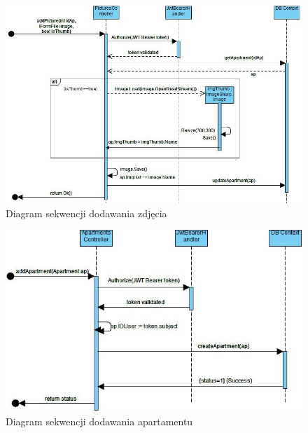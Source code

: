 \documentclass[polish, 11pt]{article}
\begin{document}
        \begin{figure}[H]
            \centering
            \includegraphics[width=\textwidth]{figures/addPictureSeq.jpg}
            \caption{Diagram sekwencji dodawania zdjęcia}
        \end{figure}
        
        \begin{figure}[H]
            \centering
            \includegraphics[width=\textwidth]{figures/addApartmentSeq.jpg}
            \caption{Diagram sekwencji dodawania apartamentu}
        \end{figure}
        
\end{document}
